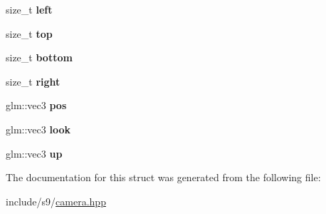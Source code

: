 \begin{DoxyCompactItemize}
\item 
\hypertarget{structs9_1_1Camera_1_1SharedObject_a135a63795416ee32a30a8e292c57ba23}{size\-\_\-t {\bfseries left}}\label{structs9_1_1Camera_1_1SharedObject_a135a63795416ee32a30a8e292c57ba23}

\item 
\hypertarget{structs9_1_1Camera_1_1SharedObject_a56659450dc3978da69350e59746fffab}{size\-\_\-t {\bfseries top}}\label{structs9_1_1Camera_1_1SharedObject_a56659450dc3978da69350e59746fffab}

\item 
\hypertarget{structs9_1_1Camera_1_1SharedObject_a3906d84e0ba0a77a7eed8656d0bc1b3c}{size\-\_\-t {\bfseries bottom}}\label{structs9_1_1Camera_1_1SharedObject_a3906d84e0ba0a77a7eed8656d0bc1b3c}

\item 
\hypertarget{structs9_1_1Camera_1_1SharedObject_aff53d20817b00d97b4d163ec534c7140}{size\-\_\-t {\bfseries right}}\label{structs9_1_1Camera_1_1SharedObject_aff53d20817b00d97b4d163ec534c7140}

\item 
\hypertarget{structs9_1_1Camera_1_1SharedObject_a2cf04002509f84712d50c29445072b74}{glm\-::vec3 {\bfseries pos}}\label{structs9_1_1Camera_1_1SharedObject_a2cf04002509f84712d50c29445072b74}

\item 
\hypertarget{structs9_1_1Camera_1_1SharedObject_aba77473460af421b56d8c596eb677d09}{glm\-::vec3 {\bfseries look}}\label{structs9_1_1Camera_1_1SharedObject_aba77473460af421b56d8c596eb677d09}

\item 
\hypertarget{structs9_1_1Camera_1_1SharedObject_a4a9c285973ecaac85a21ab80de7225d5}{glm\-::vec3 {\bfseries up}}\label{structs9_1_1Camera_1_1SharedObject_a4a9c285973ecaac85a21ab80de7225d5}

\end{DoxyCompactItemize}


The documentation for this struct was generated from the following file\-:\begin{DoxyCompactItemize}
\item 
include/s9/\hyperlink{camera_8hpp}{camera.\-hpp}\end{DoxyCompactItemize}

